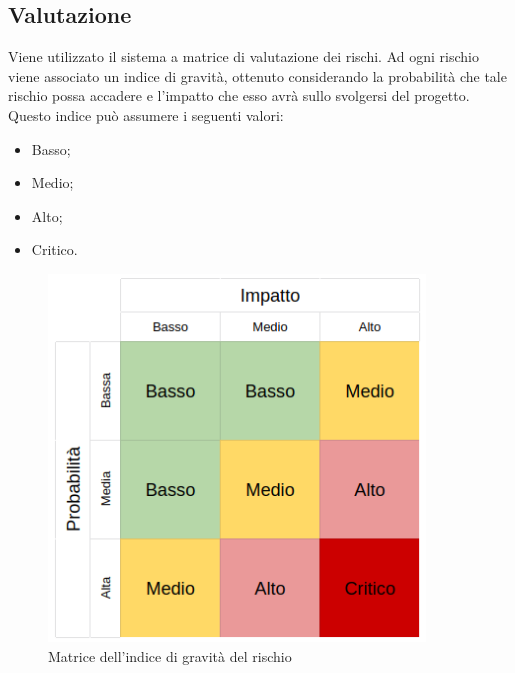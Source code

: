 \documentclass[../piano-di-progetto.tex]{subfiles}
\begin{document}
\subsection{Valutazione}
Viene utilizzato il sistema a matrice di valutazione dei rischi. Ad ogni rischio viene associato un indice di gravità, ottenuto considerando la probabilità che tale rischio possa accadere e l'impatto che esso avrà sullo svolgersi del progetto. Questo indice può assumere i seguenti valori:
\begin{itemize}
    \item Basso;
    \item Medio;
    \item Alto;
    \item Critico.
\end{itemize}
\begin{figure}[H]
	\centering
	\includegraphics[width=10cm]{img/matrice-rischio.png}
	\caption{Matrice dell'indice di gravità del rischio}
	\label{fig:matrice-rischio}
  \end{figure}
\end{document}

